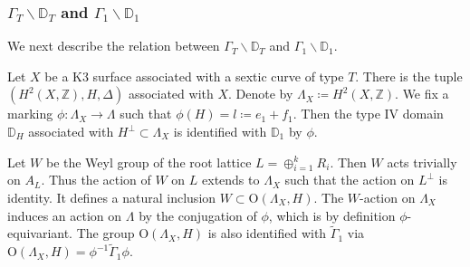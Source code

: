 \documentclass[12pt,reqno,a4paper]{amsart}
\newtheorem{prop}[thm]{Proposition~}
\theoremstyle{remark}
\theoremstyle{definition}
\newcommand{\ZZ}{\mathbb{Z}}
\newcommand{\PP}{\mathbb{P}}
\newcommand{\DD}{\mathbb{D}}
\newcommand{\calM}{\mathcal{M}}
\newcommand{\calV}{\mathcal{V}}
\newcommand\SL{\mathrm{SL}}
\newcommand\Or{\mathrm{O}}
\newcommand{\bs}{\backslash}
\newcommand{\dbs}{\bs\!\! \bs}
\begin{document}

\subsubsection{$\Gamma_T\bs\DD_T$ and $\Gamma_1\bs\DD_1$}
We next describe the relation between $\Gamma_T\bs\DD_T$ and $\Gamma_1\bs\DD_1$.

Let $X$ be a K3 surface associated with a sextic curve of type $T$. 
There is the tuple $(H^2(X,\ZZ),H,\Delta)$ associated with $X$.
Denote by $\Lambda_X\coloneqq H^2(X,\ZZ)$.
We fix a marking $\phi\colon \Lambda_X\to\Lambda$ such that $\phi(H)=l\coloneqq e_1+f_1$.
Then the type IV domain $\DD_H$ associated with $H^\perp\subset \Lambda_X$ is identified with $\DD_1$ by $\phi$.

Let $W$ be the Weyl group of the root lattice $L=\oplus_{i=1}^k R_i$. Then $W$ acts trivially on $A_L$.
Thus the action of $W$ on $L$ extends to $\Lambda_X$ such that the action on $L^\perp$ is identity.
It defines a natural inclusion $W\subset\Or(\Lambda_X,H)$.
The $W$-action on $\Lambda_X$ induces an action on $\Lambda$ by the conjugation of $\phi$, which is by definition $\phi$-equivariant.
The group $\Or(\Lambda_X,H)$ is also identified with $\widetilde\Gamma_1$ via $\Or(\Lambda_X,H) = \phi^{-1}\widetilde\Gamma_1\phi$.

\end{document}
